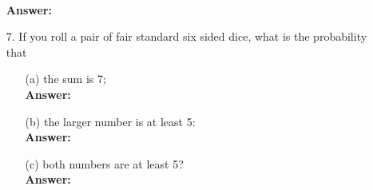 \documentclass[a4paper]{article}
\begin{document}
\begin{itemize}
\begin{equation}
	      \end{equation} \\
	      \textbf{Answer:}
	\item[7.] If you roll a pair of fair standard six sided dice, what is the probability that
	      \begin{itemize}
	      	\item[(a)] the sum is 7; \\
	      	      \textbf{Answer:} 
	      	\item[(b)] the larger number is at least 5: \\
	      	      \textbf{Answer:} 
	      	\item[(c)] both numbers are at least 5? \\
	      	      \textbf{Answer:} 
	      \end{itemize}   
\end{itemize}
\end{document}
